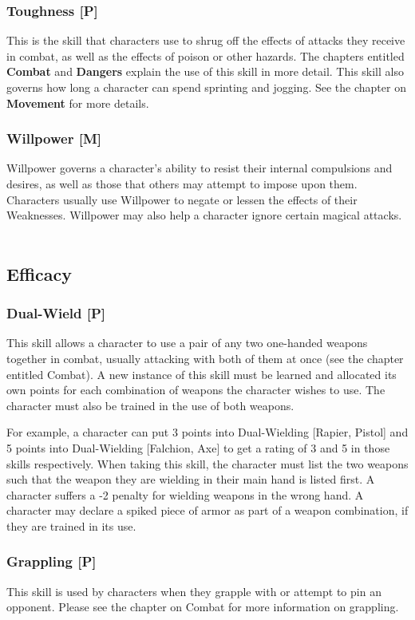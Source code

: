 \documentclass[oneside]{book}
\begin{document}
\begin{multicols}{2}
\subsubsection{Toughness [P]}
This is the skill that characters use to shrug off the effects of attacks they receive in combat, as well as the effects of poison or other hazards. The chapters entitled \textbf{Combat} and \textbf{Dangers} explain the use of this skill in more detail. This skill also governs how long a character can spend sprinting and jogging. See the chapter on \textbf{Movement} for more details.

\subsubsection{Willpower [M]}
Willpower governs a character's ability to resist their internal compulsions and desires, as well as those that others may attempt to impose upon them. Characters usually use Willpower to negate or lessen the effects of their Weaknesses. Willpower may also help a character ignore certain magical attacks.
\\
\\
\subsection{Efficacy}
\subsubsection{Dual-Wield [P]}
This skill allows a character to use a pair of any two one-handed weapons together in combat, usually attacking with both of them at once (see the chapter entitled Combat). A new instance of this skill must be learned and allocated its own points for each combination of weapons the character wishes to use. The character must also be trained in the use of both weapons. 

For example, a character can put 3 points into Dual-Wielding [Rapier, Pistol] and 5 points into Dual-Wielding [Falchion, Axe] to get a rating of 3 and 5 in those skills respectively. When taking this skill, the character must list the two weapons such that the weapon they are wielding in their main hand is listed first. A character suffers a -2 penalty for wielding weapons in the wrong hand. A character may declare a spiked piece of armor as part of a weapon combination, if they are trained in its use. 

\subsubsection{Grappling [P]}
This skill is used by characters when they grapple with or attempt to pin an opponent. Please see the chapter on Combat for more information on grappling.


\end{multicols}
\end{document}
